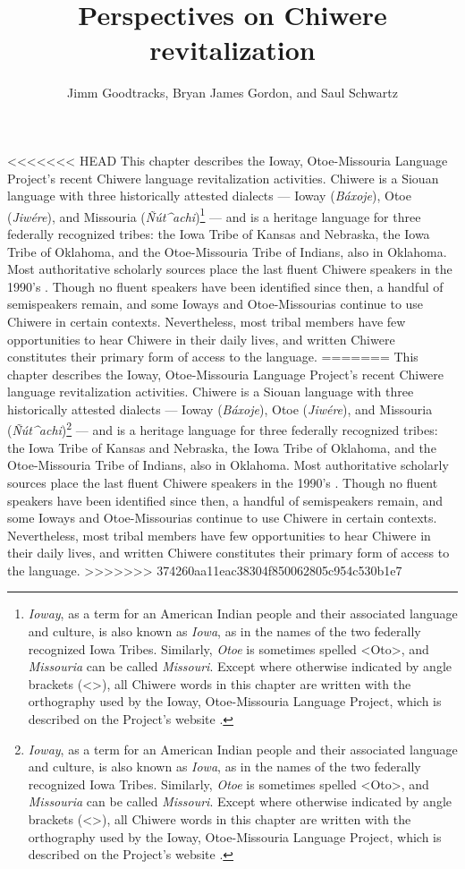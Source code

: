 \documentclass[output=paper]{LSP/langsci}
\author{Jimm Goodtracks, Bryan James Gordon, and Saul Schwartz}
\title{Perspectives on Chiwere revitalization}
\begin{document}
<<<<<<< HEAD
This chapter describes the Ioway, Otoe-Missouria Language Project's recent Chiwere language revitalization activities. Chiwere is a Siouan language with three historically attested dialects --- Ioway (\emph{Báxoje}), Otoe (\emph{Jiw\'ere}), and Missouria (\emph{\~N\'ut\^{ }achi})\footnote{\emph{Ioway}, as a term for an American Indian people and their associated language and culture, is also known as \emph{Iowa}, as in the names of the two federally recognized Iowa Tribes. Similarly, \emph{Otoe} is sometimes spelled <Oto>, and \emph{Missouria} can be called \emph{Missouri}. Except where otherwise indicated by angle brackets (<>), all Chiwere words in this chapter are written with the orthography used by the Ioway, Otoe-Missouria Language Project, which is described on the Project's website \citep{GoodtracksND}.} --- and is a heritage language for three federally recognized tribes: the Iowa Tribe of Kansas and Nebraska, the Iowa Tribe of Oklahoma, and the Otoe-Missouria Tribe of Indians, also in Oklahoma. Most authoritative scholarly sources place the last fluent Chiwere speakers in the 1990's \citep{LewisSimonsFennig2013, ParksRankin2001}. Though no fluent speakers have been identified since then, a handful of semispeakers remain, and some Ioways and Otoe-Missourias continue to use Chiwere in certain contexts. Nevertheless, most tribal members have few opportunities to hear Chiwere in their daily lives, and written Chiwere constitutes their primary form of access to the language.
=======
This chapter describes the Ioway, Otoe-Missouria Language Project's recent Chiwere language revitalization activities. Chiwere is a Siouan language with three historically attested dialects --- Ioway (\emph{B\'axoje}), Otoe (\emph{Jiw\'ere}), and Missouria (\emph{\~N\'ut\^{ }achi})\footnote{\emph{Ioway}, as a term for an American Indian people and their associated language and culture, is also known as \emph{Iowa}, as in the names of the two federally recognized Iowa Tribes. Similarly, \emph{Otoe} is sometimes spelled <Oto>, and \emph{Missouria} can be called \emph{Missouri}. Except where otherwise indicated by angle brackets (<>), all Chiwere words in this chapter are written with the orthography used by the Ioway, Otoe-Missouria Language Project, which is described on the Project's website \citep{GoodtracksND}.} --- and is a heritage language for three federally recognized tribes: the Iowa Tribe of Kansas and Nebraska, the Iowa Tribe of Oklahoma, and the Otoe-Missouria Tribe of Indians, also in Oklahoma. Most authoritative scholarly sources place the last fluent Chiwere speakers in the 1990's \citep{LewisSimonsFennig2013, ParksRankin2001}. Though no fluent speakers have been identified since then, a handful of semispeakers remain, and some Ioways and Otoe-Missourias continue to use Chiwere in certain contexts. Nevertheless, most tribal members have few opportunities to hear Chiwere in their daily lives, and written Chiwere constitutes their primary form of access to the language.
>>>>>>> 374260aa11eac38304f850062805c954c530b1e7
\end{document}
